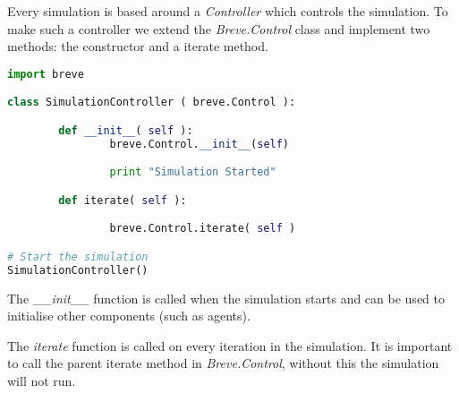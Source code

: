 
Every simulation is based around a \textit{Controller} which controls the simulation. To make such a controller we extend the \textit{Breve.Control} class and implement two methods: the constructor and a iterate method.

\begin{lstlisting}[language=Python]
import breve

class SimulationController ( breve.Control ):

        def __init__( self ):
                breve.Control.__init__(self)

                print "Simulation Started"

        def iterate( self ):

                breve.Control.iterate( self )

# Start the simulation
SimulationController()
\end{lstlisting}




The \textit{\_\_init\_\_} function is called when the simulation starts and can be used to initialise other components (such as agents). 

The \textit{iterate} function is called on every iteration in the simulation. It is important to call the parent iterate method in \textit{Breve.Control}, without this the simulation will not run.

